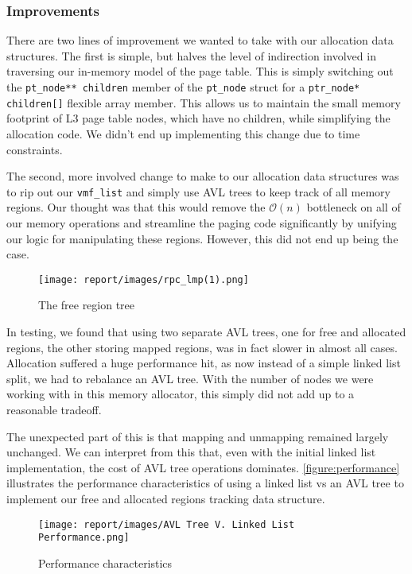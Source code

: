 \subsubsection*{Improvements} \label{improvements}

There are two lines of improvement we wanted to take with our allocation data structures. The first is simple, but halves the level of indirection involved in traversing our in-memory model of the page table. This is simply switching out the \verb|pt_node** children| member of the \verb|pt_node| struct for a \verb|ptr_node* children[]| flexible array member. This allows us to maintain the small memory footprint of L3 page table nodes, which have no children, while simplifying the allocation code. We didn't end up implementing this change due to time constraints.

The second, more involved change to make to our allocation data structures was to rip out our \verb|vmf_list| and simply use AVL trees to keep track of all memory regions. Our thought was that this would remove the $\mathcal{O}(n)$ bottleneck on all of our memory operations and streamline the paging code significantly by unifying our logic for manipulating these regions. However, this did not end up being the case. 


\begin{figure}[h] 
	\texttt{[image: report/images/rpc\_lmp(1).png]}
	\caption{The free region tree}
	\label{figure:vmf_tree}
	\centering
\end{figure}

In testing, we found that using two separate AVL trees, one for free and allocated regions, the other storing mapped regions, was in fact slower in almost all cases. Allocation suffered a huge performance hit, as now instead of a simple linked list split, we had to rebalance an AVL tree. With the number of nodes we were working with in this memory allocator, this simply did not add up to a reasonable tradeoff.

The unexpected part of this is that mapping and unmapping remained largely unchanged. We can interpret from this that, even with the initial linked list implementation, the cost of AVL tree operations dominates. \autoref{figure:performance} illustrates the performance characteristics of using a linked list vs an AVL tree to implement our free and allocated regions tracking data structure.


\begin{figure}[h] 
	\texttt{[image: report/images/AVL Tree V. Linked List Performance.png]}
	\caption{Performance characteristics}
	\label{figure:performance}
	\centering
\end{figure}